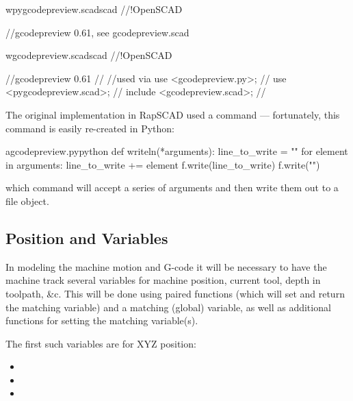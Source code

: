 \documentclass{ltxdoc}
\begin{document}
\begin{writecode}{w}{pygcodepreview.scad}{scad}
//!OpenSCAD
 
//gcodepreview 0.61, see gcodepreview.scad

\end{writecode}
\addtocounter{pyscad}{5}

\begin{writecode}{w}{gcodepreview.scad}{scad}
//!OpenSCAD
 
//gcodepreview 0.61
//
//used via use <gcodepreview.py>;
//         use <pygcodepreview.scad>;
//         include <gcodepreview.scad>;
//

\end{writecode}
\addtocounter{gcpscad}{10}

The original implementation in RapSCAD used a command  --- fortunately, 
this command is easily re-created in Python:

\lstset{firstnumber=\thegcpy}
\begin{writecode}{a}{gcodepreview.py}{python}
def writeln(*arguments):
    line_to_write = ""
    for element in arguments:
        line_to_write += element
    f.write(line_to_write)
    f.write("\n")
    
\end{writecode}
\addtocounter{gcpy}{7}

\noindent which command will accept a series of arguments and then write them out to a file 
object.

\subsection{Position and Variables}
 
In modeling the machine motion and G-code it will be necessary to have the machine track 
several variables for machine position, current tool, depth in toolpath, \&c. 
This will be done using paired functions (which will set and return the  
matching variable) and a matching (global) variable, as well as additional functions for 
setting the matching variable(s).

\begin{samepage}
The first such variables are for XYZ position:

\begin{itemize}
 \item {}
 \item {}
 \item {}
\end{itemize}
\end{samepage}
\end{document}
